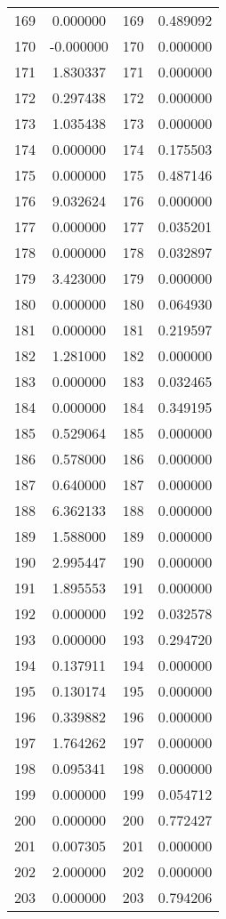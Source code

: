 \documentclass[12pt]{article}
\begin{document}
\begin{longtable}{@{}cccc@{}}
169 & 0.000000 & 169 & 0.489092 \\
170 & -0.000000 & 170 & 0.000000 \\
171 & 1.830337 & 171 & 0.000000 \\
172 & 0.297438 & 172 & 0.000000 \\
173 & 1.035438 & 173 & 0.000000 \\
174 & 0.000000 & 174 & 0.175503 \\
175 & 0.000000 & 175 & 0.487146 \\
176 & 9.032624 & 176 & 0.000000 \\
177 & 0.000000 & 177 & 0.035201 \\
178 & 0.000000 & 178 & 0.032897 \\
179 & 3.423000 & 179 & 0.000000 \\
180 & 0.000000 & 180 & 0.064930 \\
181 & 0.000000 & 181 & 0.219597 \\
182 & 1.281000 & 182 & 0.000000 \\
183 & 0.000000 & 183 & 0.032465 \\
184 & 0.000000 & 184 & 0.349195 \\
185 & 0.529064 & 185 & 0.000000 \\
186 & 0.578000 & 186 & 0.000000 \\
187 & 0.640000 & 187 & 0.000000 \\
188 & 6.362133 & 188 & 0.000000 \\
189 & 1.588000 & 189 & 0.000000 \\
190 & 2.995447 & 190 & 0.000000 \\
191 & 1.895553 & 191 & 0.000000 \\
192 & 0.000000 & 192 & 0.032578 \\
193 & 0.000000 & 193 & 0.294720 \\
194 & 0.137911 & 194 & 0.000000 \\
195 & 0.130174 & 195 & 0.000000 \\
196 & 0.339882 & 196 & 0.000000 \\
197 & 1.764262 & 197 & 0.000000 \\
198 & 0.095341 & 198 & 0.000000 \\
199 & 0.000000 & 199 & 0.054712 \\
200 & 0.000000 & 200 & 0.772427 \\
201 & 0.007305 & 201 & 0.000000 \\
202 & 2.000000 & 202 & 0.000000 \\
203 & 0.000000 & 203 & 0.794206 \\

\end{longtable}
\end{document}
